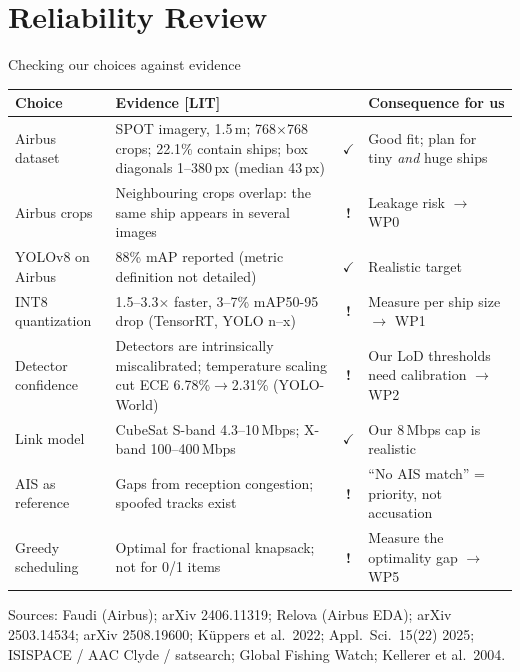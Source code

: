 \documentclass[aspectratio=169,10pt]{beamer}
\newcommand{\ok}{\textcolor{good}{$\checkmark$}}
\newcommand{\warn}{\textcolor{accent}{\textbf{!}}}
\newcommand{\LITtag}{\textcolor{muted}{\textbf{[LIT]}}}
\begin{document}
\section{Reliability Review}

\begin{frame}{Checking our choices against evidence}
\scriptsize
\renewcommand{\arraystretch}{1.12}
\begin{tabularx}{\textwidth}{@{}P{2.7cm} L c P{3.3cm}@{}}
\toprule
\textbf{Choice} & \textbf{Evidence \LITtag} & & \textbf{Consequence for us} \\
\midrule
Airbus dataset & SPOT imagery, 1.5\,m; 768$\times$768 crops; 22.1\% contain ships; box diagonals 1--380\,px (median 43\,px) & \ok & Good fit; plan for tiny \emph{and} huge ships \\
Airbus crops & Neighbouring crops overlap: the same ship appears in several images & \warn & Leakage risk $\rightarrow$ WP0 \\
YOLOv8 on Airbus & 88\% mAP reported (metric definition not detailed) & \ok & Realistic target \\
INT8 quantization & 1.5--3.3$\times$ faster, 3--7\% mAP50-95 drop (TensorRT, YOLO n--x) & \warn & Measure per ship size $\rightarrow$ WP1 \\
Detector confidence & Detectors are intrinsically miscalibrated; temperature scaling cut ECE 6.78\%$\rightarrow$2.31\% (YOLO-World) & \warn & Our LoD thresholds need calibration $\rightarrow$ WP2 \\
Link model & CubeSat S-band 4.3--10\,Mbps; X-band 100--400\,Mbps & \ok & Our 8\,Mbps cap is realistic \\
AIS as reference & Gaps from reception congestion; spoofed tracks exist & \warn & ``No AIS match'' = priority, not accusation \\
Greedy scheduling & Optimal for fractional knapsack; not for 0/1 items & \warn & Measure the optimality gap $\rightarrow$ WP5 \\
\bottomrule
\end{tabularx}
\vspace{1mm}
{\tiny\color{muted} Sources: Faudi (Airbus); arXiv 2406.11319; Relova (Airbus EDA); arXiv 2503.14534; arXiv 2508.19600; K\"uppers et al.\ 2022; Appl.\ Sci.\ 15(22) 2025; ISISPACE / AAC Clyde / satsearch; Global Fishing Watch; Kellerer et al.\ 2004.}
\end{frame}
\end{document}
